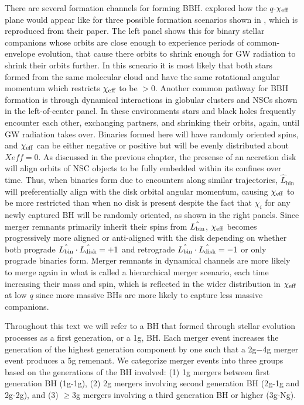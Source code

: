 There are several formation channels for forming BBH.
\citet{Santini+23} explored how the $q$-$\chi_{\rm eff}$ plane would appear like for three possible formation scenarios shown in , which is reproduced from their paper.
The left panel shows this for binary stellar companions whose orbits are close enough to experience periods of common-envelope evolution, that cause there orbits to shrink enough for GW radiation to shrink their orbits further.
In this scneario it is most likely that both stars formed from the same molecular cloud and have the same rotational angular momentum which restricts $\chi_{\rm eff}$ to be $>0$.
Another common pathway for BBH formation is through dynamical interactions in globular clusters and NSCs shown in the left-of-center panel.
In these environments stars and black holes frequently encounter each other, exchanging partners, and shrinking their orbits, again, until GW radiation takes over.
Binaries formed here will have randomly oriented spins, and $\chi_{\rm eff}$ can be either negative or positive but will be evenly distributed about $Xeff=0$.
As discussed in the previous chapter, the presense of an accretion disk will align orbits of NSC objects to be fully embedded within its confines over time.
Thus, when binaries form due to encounters along similar trajectories, $\hat{L}_\text{bin}$ will preferentially align with the disk orbital angular momentum, causing $\chi_{\rm eff}$ to be more restricted than when no disk is present despite the fact that $\chi_i$ for any newly captured BH will be randomly oriented, as shown in the right panels.
Since merger remnants primarily inherit their spins from $\hat{L_{\rm bin}}$, $\chi_{\rm eff}$ becomes progressively more aligned or anti-aligned with the disk depending on whether both prograde $\hat{L_{\rm bin}} \cdot \hat{L_{\rm disk}} = +1$ and retrograde $\hat{L_{\rm bin}} \cdot \hat{L_{\rm disk}} = -1$ or only prograde binaries form.
Merger remnants in dynamical channels are more likely to merge again in what is called a hierarchical merger scenario, each time increasing their mass and spin, which is reflected in the wider distribution in $\chi_{\rm eff}$ at low $q$ since more massive BHs are more likely to capture less massive companions.


Throughout this text we will refer to a BH that formed through stellar evolution processes as a first generation, or a 1g, BH.
Each merger event increases the generation of the highest generation component by one such that a 2g$-$4g merger event produces a 5g remenant.
We categorize merger events into three groups based on the generations of the BH involved: (1) 1g mergers between first generation BH (1g-1g), (2) 2g mergers involving second generation BH (2g-1g and 2g-2g), and (3) $\geq$3g mergers involving a third generation BH or higher (3g-Ng).

